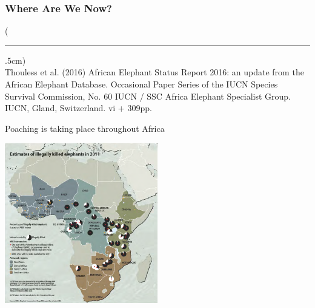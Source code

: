 \documentclass[10pt]{beamer}
\newenvironment{reference}[2]{%
	\begin{textblock*}{\textwidth}(#1,#2)
		\tiny\bgroup\color{gray}}{\egroup\end{textblock*}}
\begin{document}
\begin{frame}[t]
\frametitle{Where Are We Now?}
\vspace{0.25cm}

	\begin{reference}{4mm}{88mm}
		\rule{1.5cm}{0.25pt}\\
		Thouless et al. (2016) African Elephant Status Report 2016: an update from the African Elephant Database. Occasional Paper Series of the IUCN Species Survival Commission, No. 60 IUCN / SSC Africa Elephant Specialist Group. IUCN, Gland, Switzerland. vi + 309pp.
	\end{reference}
	
	
	Poaching is taking place throughout Africa  
	
	\vspace{0.25cm}
	
	\begin{center}
		\includegraphics[width=0.50\textwidth]{figures/current_poaching_locations.png}
	\end{center}	
\end{frame}
\end{document}
